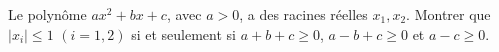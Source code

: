 Le polynôme $ax^2 + bx + c$, avec $a > 0$, a des racines réelles $x_1, x_2$. Montrer que $|x_i| \leq 1$ $(i = 1, 2)$ si et seulement si $a + b + c \geq 0$, $a - b + c \geq 0$ et $a - c \geq 0$.
